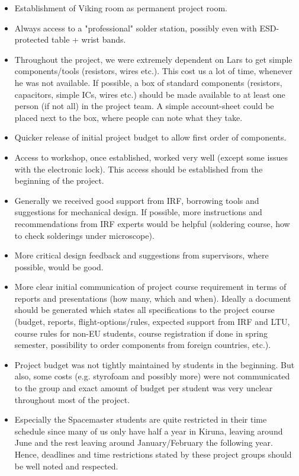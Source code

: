 \begin{itemize}
\item Establishment of Viking room as permanent project room.
\item Always access to a "professional" solder station, possibly even with ESD-protected table + wrist bands.
\item Throughout the project, we were extremely dependent on Lars to get simple components/tools (resistors, wires etc.). This cost us a lot of time, whenever he was not available. If possible, a box of standard components (resistors, capacitors, simple ICs, wires etc.) should be made available to at least one person (if not all) in the project team. A simple account-sheet could be placed next to the box, where people can note what they take.
\item Quicker release of initial project budget to allow first order of components.
\item Access to workshop, once established, worked very well (except some issues with the electronic lock). This access should be established from the beginning of the project.
\item Generally we received good support from IRF, borrowing tools and suggestions for mechanical design. If possible, more instructions and recommendations from IRF experts would be helpful (soldering course, how to check solderings under microscope).
\item More critical design feedback and suggestions from supervisors, where possible, would be good.
\item More clear initial communication of project course requirement in terms of reports and presentations (how many, which and when). Ideally a document should be generated which states all specifications to the project course (budget, reports, flight-options/rules, expected support from IRF and LTU, course rules for non-EU students, course registration if done in spring semester, possibility to order components from foreign countries, etc.).
\item Project budget was not tightly maintained by students in the beginning. But also, some costs (e.g. styrofoam and possibly more) were not communicated to the group and exact amount of budget per student was very unclear throughout most of the project.
\item Especially the Spacemaster students are quite restricted in their time schedule since many of us only have half a year in Kiruna, leaving around June and the rest leaving around January/February the following year. Hence, deadlines and time restrictions stated by these project groups should be well noted and respected.
\end{itemize}